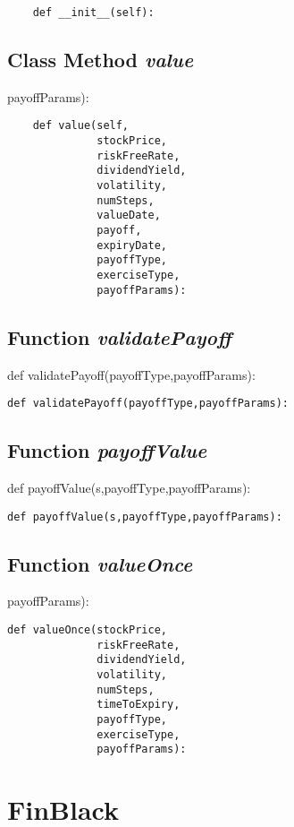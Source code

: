 \documentclass[twoside,11pt]{book}
\begin{document}
\begin{lstlisting}
    def __init__(self):
\end{lstlisting}

\subsection{Class Method {\it value}}
payoffParams):

\begin{lstlisting}
    def value(self,
              stockPrice,
              riskFreeRate,
              dividendYield,
              volatility,
              numSteps,
              valueDate,
              payoff,
              expiryDate,
              payoffType,
              exerciseType,
              payoffParams):
\end{lstlisting}

\subsection{Function {\it validatePayoff}}
def validatePayoff(payoffType,payoffParams):

\begin{lstlisting}
def validatePayoff(payoffType,payoffParams):
\end{lstlisting}

\subsection{Function {\it payoffValue}}
def payoffValue(s,payoffType,payoffParams):

\begin{lstlisting}
def payoffValue(s,payoffType,payoffParams):
\end{lstlisting}

\subsection{Function {\it valueOnce}}
payoffParams):

\begin{lstlisting}
def valueOnce(stockPrice,
              riskFreeRate,
              dividendYield,
              volatility,
              numSteps,
              timeToExpiry,
              payoffType,
              exerciseType,
              payoffParams):
\end{lstlisting}

\newpage
\section{FinBlack}
\end{document}
